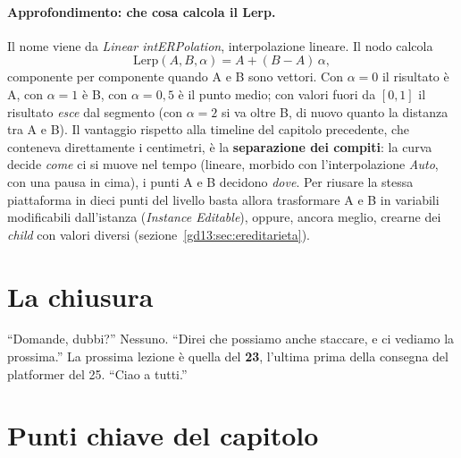 \paragraph{Approfondimento: che cosa calcola il Lerp.} Il nome viene da
\emph{Linear intERPolation}, interpolazione lineare. Il nodo calcola
\[
  \mathrm{Lerp}(A, B, \alpha) = A + (B - A)\,\alpha ,
\]
componente per componente quando A e B sono vettori. Con $\alpha = 0$ il
risultato è A, con $\alpha = 1$ è B, con $\alpha = 0{,}5$ è il punto medio; con
valori fuori da $[0, 1]$ il risultato \emph{esce} dal segmento (con $\alpha = 2$
si va oltre B, di nuovo quanto la distanza tra A e B). Il vantaggio rispetto
alla timeline del capitolo precedente, che conteneva direttamente i centimetri,
è la \textbf{separazione dei compiti}: la curva decide \emph{come} ci si muove
nel tempo (lineare, morbido con l'interpolazione \emph{Auto}, con una pausa in
cima), i punti A e B decidono \emph{dove}. Per riusare la stessa piattaforma in
dieci punti del livello basta allora trasformare A e B in variabili modificabili
dall'istanza (\emph{Instance Editable}), oppure, ancora meglio, crearne dei
\emph{child} con valori diversi (sezione~\ref{gd13:sec:ereditarieta}).

\section{La chiusura}
\label{gd13:sec:chiusura}

``Domande, dubbi?'' Nessuno. ``Direi che possiamo anche staccare, e ci vediamo
la prossima.'' La prossima lezione è quella del \textbf{23}, l'ultima prima della
consegna del platformer del 25. ``Ciao a tutti.''

\section*{Punti chiave del capitolo}

